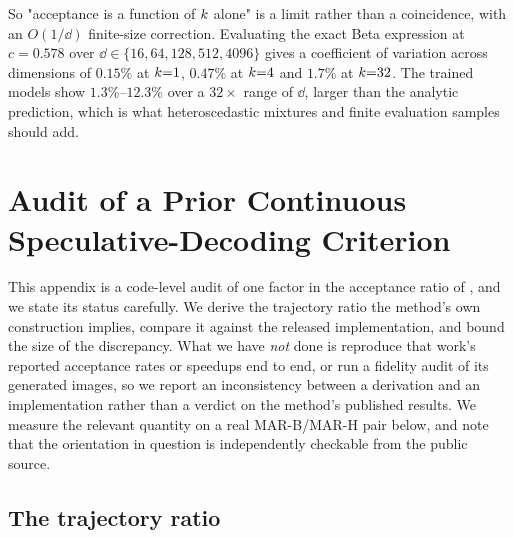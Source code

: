 So "acceptance is a function of $k$ alone" is a limit rather than a coincidence, with an $O(1/\dd)$
finite-size correction. Evaluating the exact Beta expression at $c = 0.578$ over
$\dd \in \{16, 64, 128, 512, 4096\}$ gives a coefficient of variation across dimensions of $0.15\%$ at
$k{=}1$, $0.47\%$ at $k{=}4$ and $1.7\%$ at $k{=}32$. The trained models show $1.3\%$--$12.3\%$
over a $32\times$ range of $\dd$, larger than the analytic prediction, which is what heteroscedastic
mixtures and finite evaluation samples should add.

\section{Audit of a Prior Continuous Speculative-Decoding Criterion}
\label{app:cspd}

This appendix is a code-level audit of one factor in the acceptance ratio of
\citet{wang2025continuous}, and we state its status carefully. We derive the trajectory ratio the
method's own construction implies, compare it against the released implementation, and bound the
size of the discrepancy. What we have \emph{not} done is reproduce that work's reported acceptance
rates or speedups end to end, or run a fidelity audit of its generated images, so we report an
inconsistency between a derivation and an implementation rather than a verdict on the method's
published results. We measure the relevant quantity on a real MAR-B/MAR-H pair below, and note that
the orientation in question is independently checkable from the public source.

\subsection{The trajectory ratio}

